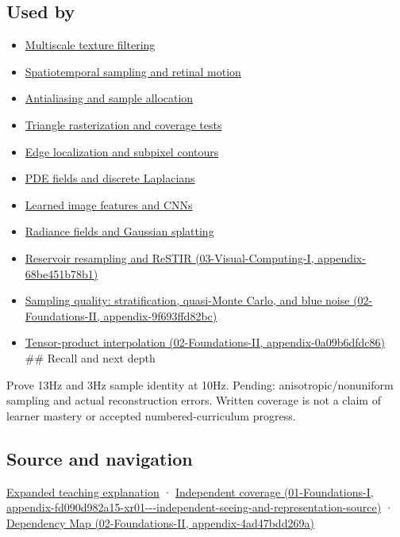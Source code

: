 \subsection{Used by}\label{appendix-6a7869dd79a6-used-by}

\begin{itemize}
\item
  \hyperref[appendix-b677a85ba76f]{Multiscale texture filtering}
\item
  \hyperref[appendix-70895739febb]{Spatiotemporal sampling and retinal motion}
\item
  \hyperref[appendix-4192b2bdd21e]{Antialiasing and sample allocation}
\item
  \hyperref[appendix-ed3f9bc298fe]{Triangle rasterization and coverage tests}
\item
  \hyperref[appendix-36022286b03e]{Edge localization and subpixel contours}
\item
  \hyperref[appendix-1988d465c119]{PDE fields and discrete Laplacians}
\item
  \hyperref[appendix-47c51ea026fb]{Learned image features and CNNs}
\item
  \hyperref[appendix-c5b332e400e7]{Radiance fields and Gaussian splatting}
\item
  \href{../03-Visual-Computing-I/main.pdf\#nameddest=appendix-68be451b78b1}{Reservoir resampling and ReSTIR (03-Visual-Computing-I, appendix-68be451b78b1)}
\item
  \href{../02-Foundations-II/main.pdf\#nameddest=appendix-9f693ffd82bc}{Sampling quality: stratification, quasi-Monte Carlo, and blue noise (02-Foundations-II, appendix-9f693ffd82bc)}
\item
  \href{../02-Foundations-II/main.pdf\#nameddest=appendix-0a09b6dfdc86}{Tensor-product interpolation (02-Foundations-II, appendix-0a09b6dfdc86)} \#\# Recall and next depth
\end{itemize}

Prove 13Hz and 3Hz sample identity at 10Hz. Pending: anisotropic/nonuniform sampling and actual reconstruction errors. Written coverage is not a claim of learner mastery or accepted numbered-curriculum progress.

\subsection{Source and navigation}\label{appendix-6a7869dd79a6-source-and-navigation}

\href{Continuous\%20Notes/University\%20-\%20Worlds,\%20Images\%20and\%20Inference\%20-\%20Graphics,\%20Vision\%20and\%20Photography\#Sampling\%20is\%20a\%20question\%20of\%20what\%20remains\%20distinguishable}{Expanded teaching explanation} · \href{../01-Foundations-I/main.pdf\#nameddest=appendix-fd090d982a15-xr01---independent-seeing-and-representation-source}{Independent coverage (01-Foundations-I, appendix-fd090d982a15-xr01-\/-\/-independent-seeing-and-representation-source)} · \href{../02-Foundations-II/main.pdf\#nameddest=appendix-4ad47bdd269a}{Dependency Map (02-Foundations-II, appendix-4ad47bdd269a)}

